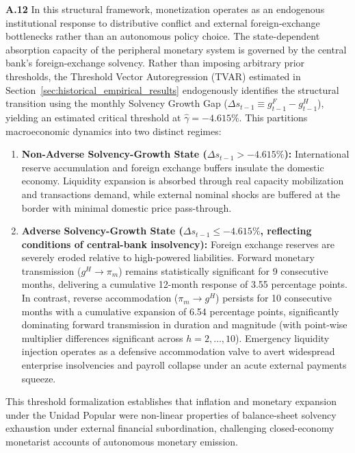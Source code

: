 \textbf{A.12} In this structural framework, monetization operates as an endogenous institutional response to distributive conflict and external foreign-exchange bottlenecks rather than an autonomous policy choice. The state-dependent absorption capacity of the peripheral monetary system is governed by the central bank's foreign-exchange solvency. Rather than imposing arbitrary prior thresholds, the Threshold Vector Autoregression (TVAR) estimated in Section~\ref{sec:historical_empirical_results} endogenously identifies the structural transition using the monthly Solvency Growth Gap ($\Delta s_{t-1} \equiv g^F_{t-1} - g^H_{t-1}$), yielding an estimated critical threshold at $\hat{\gamma} = -4.615\%$. This partitions macroeconomic dynamics into two distinct regimes:
\begin{enumerate}[leftmargin=2em]
	\item \textbf{Non-Adverse Solvency-Growth State ($\Delta s_{t-1} > -4.615\%$):} International reserve accumulation and foreign exchange buffers insulate the domestic economy. Liquidity expansion is absorbed through real capacity mobilization and transactions demand, while external nominal shocks are buffered at the border with minimal domestic price pass-through.
	\item \textbf{Adverse Solvency-Growth State ($\Delta s_{t-1} \le -4.615\%$, reflecting conditions of central-bank insolvency):} Foreign exchange reserves are severely eroded relative to high-powered liabilities. Forward monetary transmission ($g^H \to \pi_m$) remains statistically significant for 9 consecutive months, delivering a cumulative 12-month response of 3.55 percentage points. In contrast, reverse accommodation ($\pi_m \to g^H$) persists for 10 consecutive months with a cumulative expansion of 6.54 percentage points, significantly dominating forward transmission in duration and magnitude (with point-wise multiplier differences significant across $h=2,\dots,10$). Emergency liquidity injection operates as a defensive accommodation valve to avert widespread enterprise insolvencies and payroll collapse under an acute external payments squeeze.
\end{enumerate}
This threshold formalization establishes that inflation and monetary expansion under the Unidad Popular were non-linear properties of balance-sheet solvency exhaustion under external financial subordination, challenging closed-economy monetarist accounts of autonomous monetary emission.
